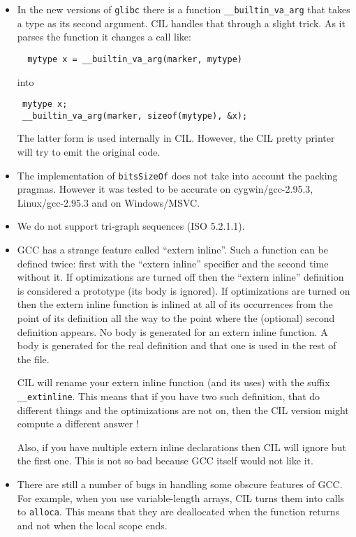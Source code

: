 \documentclass{article}
\def\t#1{{\tt #1}}
\begin{document}
\begin{itemize}

\item In the new versions of \t{glibc} there is a function
  \t{\_\_builtin\_va\_arg} that takes a type as its second argument. CIL
  handles that through a slight trick. As it parses the function it changes a
  call like:
\begin{verbatim}
  mytype x = __builtin_va_arg(marker, mytype)
\end{verbatim}
 into 
\begin{verbatim}
 mytype x;
 __builtin_va_arg(marker, sizeof(mytype), &x);
\end{verbatim}

 The latter form is used internally in CIL. However, the CIL pretty printer
 will try to emit the original code. 


\item The implementation of \t{bitsSizeOf} does not take into account the
packing pragmas. However it was tested to be accurate on cygwin/gcc-2.95.3,
Linux/gcc-2.95.3 and on Windows/MSVC.

\item We do not support tri-graph sequences (ISO 5.2.1.1).

\item GCC has a strange feature called ``extern inline''. Such a function can
be defined twice: first with the ``extern inline'' specifier and the second
time without it. If optimizations are turned off then the ``extern inline''
definition is considered a prototype (its body is ignored). If optimizations
are turned on then the extern inline function is inlined at all of its
occurrences from the point of its definition all the way to the point where the
(optional) second definition appears. No body is generated for an extern
inline function. A body is generated for the real definition and that one is
used in the rest of the file. 

 CIL will rename your extern inline function (and its uses) with the suffix
 \t{\_\_extinline}. This means that if you have two such definition, that do
 different things and the optimizations are not on, then the CIL version might
 compute a different answer !

 Also, if you have multiple extern inline declarations then CIL will ignore
but the first one. This is not so bad because GCC itself would not like it. 

\item There are still a number of bugs in handling some obscure features of
GCC. For example, when you use variable-length arrays, CIL turns them into
calls to \t{alloca}. This means that they are deallocated when the function
returns and not when the local scope ends. 


\end{itemize}
\end{document}
